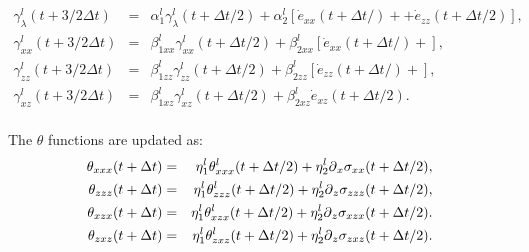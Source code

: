 \documentclass[11pt]{article}
\begin{document}
\begin{eqnarray}
\gamma^l_{\lambda}(t+3/2\Delta t)  & = &\alpha^l_1 
                        \gamma^l_{\lambda}(t+\Delta t/2) 
                        + \alpha^l_2\left[ \dot{e}_{xx}(t+\Delta t/)+ 
                        +\dot{e}_{zz}(t+\Delta t/2)\right] ,\nonumber \\
\gamma^l_{xx}(t+3/2\Delta t)     & = &\beta^l_{1xx} 
                        \gamma^l_{xx}(t+\Delta t/2) 
                        + \beta^l_{2xx}\left[ \dot{e}_{xx}(t+\Delta t/)+ 
                        \right] ,\nonumber \\
\gamma^l_{zz}(t+3/2\Delta t)     & = &\beta^l_{1zz} 
                        \gamma^l_{zz}(t+\Delta t/2) 
                        + \beta^l_{2zz}\left[ \dot{e}_{zz}(t+\Delta t/)+ 
                        \right] ,\nonumber \\
\gamma^l_{xz}(t+3/2\Delta t)      & = &\beta^l_{1xz} \gamma^l_{xz}
                                       (t+\Delta t/2)
                        + \beta^l_{2xz}\dot{e}_{xz}(t+\Delta t/2).\nonumber\\
\end{eqnarray}

The $\theta$ functions are updated as:
\begin{eqnarray}
   \theta_{xxx}(t+\Delta t)  
                      & = &\eta^l_{1} \theta^l_{xxx}(t + \Delta t/2)
                      + \eta^l_{2}\mbox{$\partial$}_x{\sigma}_{xx}(t+\Delta t/2),\nonumber\\
   \theta_{zzz}(t+\Delta t)  
                      & = &\eta^l_{1} \theta^l_{zzz}(t + \Delta t/2)
                      + \eta^l_{2}\mbox{$\partial$}_z {\sigma}_{zzz}(t+\Delta t/2),\nonumber\\
   \theta_{xzx}(t+\Delta t)  
                      & = &\eta^l_{1} \theta^l_{xzx}(t + \Delta t/2)
                      + \eta^l_{2}\mbox{$\partial$}_z {\sigma}_{xzx}(t+\Delta t/2).\nonumber\\
   \theta_{zxz}(t+\Delta t)  
                      & = &\eta^l_{1} \theta^l_{zxz}(t + \Delta t/2)
                      + \eta^l_{2}\mbox{$\partial$}_z {\sigma}_{zxz}(t+\Delta t/2).\nonumber\\
\end{eqnarray}
\end{document}
